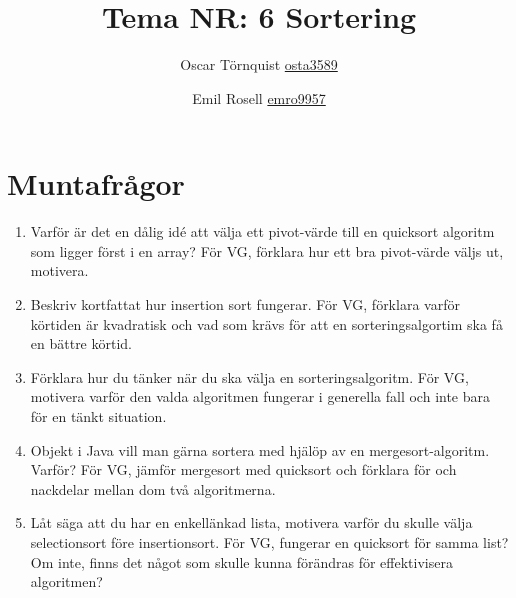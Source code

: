 \documentclass[a5paper,10pt,oneside]{article}
\title{Tema NR: 6 Sortering}
\author{Oscar Törnquist \url{osta3589} \and Emil Rosell \url{emro9957}}
\begin{document}
\maketitle

\section*{Muntafrågor}
\begin{enumerate}
\item Varför är det en dålig idé att välja ett pivot-värde till en quicksort algoritm som ligger först i en array? För VG, förklara hur ett bra pivot-värde väljs ut, motivera.
\item Beskriv kortfattat hur insertion sort fungerar. För VG, förklara varför körtiden är kvadratisk och vad som krävs för att en sorteringsalgortim ska få en bättre körtid.
\item Förklara hur du tänker när du ska välja en sorteringsalgoritm. För VG, motivera varför den valda algoritmen fungerar i generella fall och inte bara för en tänkt situation.
\item Objekt i Java vill man gärna sortera med hjälöp av en mergesort-algoritm. Varför? För VG, jämför mergesort med quicksort och förklara för och nackdelar mellan dom två algoritmerna.
\item Låt säga att du har en enkellänkad lista, motivera varför du skulle välja selectionsort före insertionsort. För VG, fungerar en quicksort för samma list? Om inte, finns det något som skulle kunna förändras för effektivisera algoritmen?
\end{enumerate}
\end{document}
